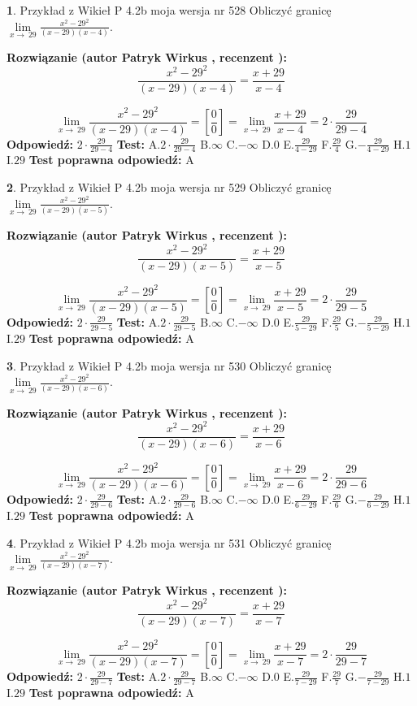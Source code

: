 \documentclass[12pt, a4paper]{article}
\theoremstyle{definition} %
\newtheorem{zad}{}
\newcommand{\zadStart}[1]{\begin{zad}#1\newline}
\newcommand{\zadStop}{\end{zad}}
\newcommand{\rozwStart}[2]{\noindent \textbf{Rozwiązanie (autor #1 , recenzent #2): }\newline}
\newcommand{\rozwStop}{\newline}
\newcommand{\odpStart}{\noindent \textbf{Odpowiedź:}\newline}
\newcommand{\odpStop}{\newline}
\newcommand{\testStart}{\noindent \textbf{Test:}\newline}
\newcommand{\testStop}{\newline}
\newcommand{\kluczStart}{\noindent \textbf{Test poprawna odpowiedź:}\newline}
\newcommand{\kluczStop}{\newline}
\begin{document}
\zadStart{Przykład z Wikieł P 4.2b moja wersja nr 528}
Obliczyć granicę $\lim\limits_{x\to\ 29}\frac{x^{2}-29^{2}}{(x-29)(x-4)}$.
\zadStop
\rozwStart{Patryk Wirkus}{}
$$\frac{x^{2}-29^{2}}{(x-29)(x-4)}=\frac{x+29}{x-4}$$

$$\lim\limits_{x\to\ 29}\frac{x^{2}-29^{2}}{(x-29)(x-4)}=[\frac{0}{0}]=\lim\limits_{x\to\ 29}\frac{x+29}{x-4}=2 \cdot \frac{29}{29-4}$$
\rozwStop
\odpStart
$2 \cdot \frac{29}{29-4}$
\odpStop
\testStart
A.$2 \cdot \frac{29}{29-4}$
B.$\infty$
C.$-\infty$
D.$0$
E.$\frac{29}{4-29}$
F.$\frac{29}{4}$
G.$-\frac{29}{4-29}$
H.$1$
I.$29$
\testStop
\kluczStart
A
\kluczStop



\zadStart{Przykład z Wikieł P 4.2b moja wersja nr 529}
Obliczyć granicę $\lim\limits_{x\to\ 29}\frac{x^{2}-29^{2}}{(x-29)(x-5)}$.
\zadStop
\rozwStart{Patryk Wirkus}{}
$$\frac{x^{2}-29^{2}}{(x-29)(x-5)}=\frac{x+29}{x-5}$$

$$\lim\limits_{x\to\ 29}\frac{x^{2}-29^{2}}{(x-29)(x-5)}=[\frac{0}{0}]=\lim\limits_{x\to\ 29}\frac{x+29}{x-5}=2 \cdot \frac{29}{29-5}$$
\rozwStop
\odpStart
$2 \cdot \frac{29}{29-5}$
\odpStop
\testStart
A.$2 \cdot \frac{29}{29-5}$
B.$\infty$
C.$-\infty$
D.$0$
E.$\frac{29}{5-29}$
F.$\frac{29}{5}$
G.$-\frac{29}{5-29}$
H.$1$
I.$29$
\testStop
\kluczStart
A
\kluczStop



\zadStart{Przykład z Wikieł P 4.2b moja wersja nr 530}
Obliczyć granicę $\lim\limits_{x\to\ 29}\frac{x^{2}-29^{2}}{(x-29)(x-6)}$.
\zadStop
\rozwStart{Patryk Wirkus}{}
$$\frac{x^{2}-29^{2}}{(x-29)(x-6)}=\frac{x+29}{x-6}$$

$$\lim\limits_{x\to\ 29}\frac{x^{2}-29^{2}}{(x-29)(x-6)}=[\frac{0}{0}]=\lim\limits_{x\to\ 29}\frac{x+29}{x-6}=2 \cdot \frac{29}{29-6}$$
\rozwStop
\odpStart
$2 \cdot \frac{29}{29-6}$
\odpStop
\testStart
A.$2 \cdot \frac{29}{29-6}$
B.$\infty$
C.$-\infty$
D.$0$
E.$\frac{29}{6-29}$
F.$\frac{29}{6}$
G.$-\frac{29}{6-29}$
H.$1$
I.$29$
\testStop
\kluczStart
A
\kluczStop



\zadStart{Przykład z Wikieł P 4.2b moja wersja nr 531}
Obliczyć granicę $\lim\limits_{x\to\ 29}\frac{x^{2}-29^{2}}{(x-29)(x-7)}$.
\zadStop
\rozwStart{Patryk Wirkus}{}
$$\frac{x^{2}-29^{2}}{(x-29)(x-7)}=\frac{x+29}{x-7}$$

$$\lim\limits_{x\to\ 29}\frac{x^{2}-29^{2}}{(x-29)(x-7)}=[\frac{0}{0}]=\lim\limits_{x\to\ 29}\frac{x+29}{x-7}=2 \cdot \frac{29}{29-7}$$
\rozwStop
\odpStart
$2 \cdot \frac{29}{29-7}$
\odpStop
\testStart
A.$2 \cdot \frac{29}{29-7}$
B.$\infty$
C.$-\infty$
D.$0$
E.$\frac{29}{7-29}$
F.$\frac{29}{7}$
G.$-\frac{29}{7-29}$
H.$1$
I.$29$
\testStop
\kluczStart
A
\kluczStop
\end{document}
